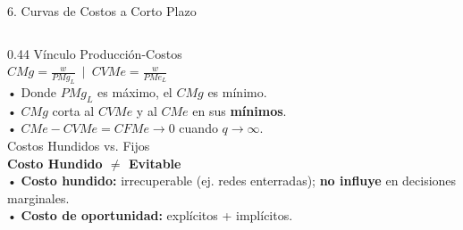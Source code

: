 \documentclass[aspectratio=169, 10pt]{beamer}
\begin{document}
\begin{frame}{6. Curvas de Costos a Corto Plazo}
\begin{columns}[T]
    \begin{column}{0.44\textwidth}
      {\scriptsize\color{grisTexto}Vínculo Producción-Costos}\\[1pt]
      {\large\color{azulPrincipal}\textbf{\(CMg = \frac{w}{PMg_L} \ \mid \ CVMe = \frac{w}{PMe_L}\)}}\\[5pt]
      {\scriptsize
        • Donde \(PMg_L\) es máximo, el \(CMg\) es mínimo.\\
        • \(CMg\) corta al \(CVMe\) y al \(CMe\) en sus \textbf{mínimos}.\\
        • \(CMe - CVMe = CFMe \to 0\) cuando \(q \to \infty\).\\[3pt]
      }
      {\scriptsize\color{grisTexto}Costos Hundidos vs. Fijos}\\[1pt]
      {\large\color{rojoAcento}\textbf{Costo Hundido \(\neq\) Evitable}}\\[4pt]
      {\scriptsize
        • \textbf{Costo hundido:} irrecuperable (ej. redes enterradas); \textbf{no influye} en decisiones marginales.\\
        • \textbf{Costo de oportunidad:} explícitos + implícitos.
      }
    \end{column}
  \end{columns}

\end{frame}
\end{document}
